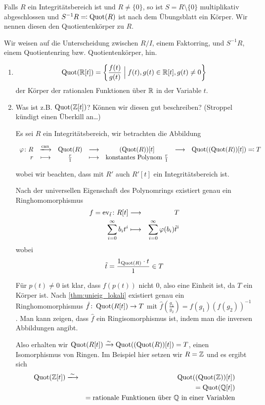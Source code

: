 \documentclass[12pt,a4paper]{scrartcl}
\begin{document}
\begin{defi}
	Falls $R$ ein Integritätsbereich ist und $R\neq\{0\}$, so ist $S = R\setminus\{0\}$ multiplikativ abgeschlossen und $S^{-1}R \eqqcolon \operatorname{Quot}(R)$ ist nach dem Übungsblatt ein Körper. Wir nennen diesen den Quotientenkörper zu $R$.
\end{defi}
\begin{bem} Wir weisen auf die Unterscheidung zwischen $R/I$, einem Faktorring, und $S^{-1}R$, einem Quotientenring bzw. Quotientenkörper, hin.
\end{bem}
\begin{bsp}
	\leavevmode
	\begin{enumerate}
		\item $$\operatorname{Quot}(\mathbb R[t]) = \left\{\frac{f(t)}{g(t)}\mathrel{\Big|} f(t), g(t)\in \mathbb R[t], g(t)\neq 0\right\}$$der Körper der rationalen Funktionen über $\mathbb R$ in der Variable $t$.
		
		\item Was ist z.B. $\operatorname{Quot}(\mathbb Z[t])$? Können wir diesen \glqq gut\grqq{} beschreiben? (Stroppel kündigt einen Überkill an\dots)
		
		Es sei $R$ ein Integritätsbereich, wir betrachten die Abbildung
		
		$\begin{array}{rcccccl}
		\phi\colon R & \xlongrightarrow{\can} & \Quot(R) &\longto& (\Quot(R))[t] &\longto& \Quot((\Quot(R))[t]) \eqqcolon T\\
		r& \longmapsto & \frac r1 & \longmapsto & \text{konstantes Polynom } \frac r1
		\end{array}$
		
		wobei wir beachten, dass mit $R'$ auch $R'[t]$ ein Integritätsbereich ist.
		
		Nach der universellen Eigenschaft des Polynomrings existiert genau ein Ringhomomorphismus
		\begin{eqnarray*}
			f = \operatorname{ev}_{\tilde{t}}\colon R[t] & \longrightarrow & T\\
			\sum_{i = 0}^{\infty} b_it^i & \longmapsto & \sum_{i = 0}^{\infty}\varphi(b_i)\tilde{t}^i
		\end{eqnarray*}
		wobei $$\tilde{t} = \frac{1_{\operatorname{Quot}(R)}\cdot t}{1} \in T$$
		
		Für $p(t)\neq 0$ ist klar, dass $f(p(t))$ nicht $0$, also eine Einheit ist, da $T$ ein Körper ist. Nach \cref{thm:unieig_lokali} existiert genau ein Ringhomomorphismus $\hat{f}\colon \operatorname{Quot}(R[t])\to T$ mit $\hat{f}\left(\frac{g_1}{g_2}\right) = f(g_1)(f(g_2))^{-1}$. Man kann zeigen, dass $\hat{f}$ ein Ringisomorphismus ist, indem man die inversen Abbildungen angibt.
		
		Also erhalten wir $\operatorname{Quot}(R[t])\xrightarrow{\sim} \operatorname{Quot}((\operatorname{Quot}(R))[t]) = T$, einen Isomorphismus von Ringen. Im Beispiel hier setzen wir $R = \mathbb Z$ und es ergibt sich
		\begin{eqnarray*}
			\Quot(\IZ[t]) & \xlongrightarrow{\sim} & \Quot((\Quot(\IZ))[t])\\
			& &= \Quot(\IQ[t])\\
			&& = \text{rationale Funktionen über $\IQ$ in einer Variablen}
		\end{eqnarray*}
	\end{enumerate}
\end{bsp}
\end{document}
